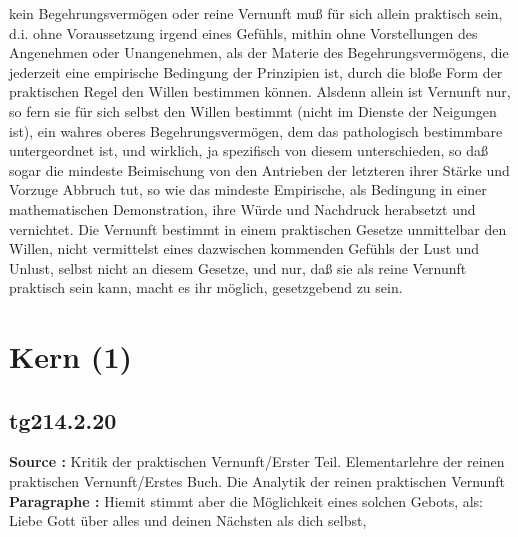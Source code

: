 \documentclass[a4paper,12pt,twoside]{book}
\newcommand{\unnumberedsection}[1]{
	\section*{#1}
	\addcontentsline{toc}{section}{#1}
	\markright{#1}
}
\begin{document}
kein Begehrungsvermögen oder reine Vernunft muß für sich allein praktisch sein, d.i. ohne Voraussetzung irgend eines Gefühls, mithin ohne Vorstellungen des Angenehmen oder Unangenehmen, als der Materie des Begehrungsvermögens, die jederzeit eine empirische Bedingung der Prinzipien ist, durch die bloße Form der praktischen Regel den Willen bestimmen können. Alsdenn allein ist Vernunft nur, so fern sie für sich selbst den Willen bestimmt (nicht im Dienste der Neigungen ist), ein wahres oberes Begehrungsvermögen, dem das pathologisch bestimmbare untergeordnet ist, und wirklich, ja spezifisch von diesem unterschieden, so daß sogar die mindeste Beimischung von den Antrieben der letzteren ihrer Stärke und Vorzuge Abbruch tut, so wie das mindeste Empirische, als Bedingung in einer mathematischen Demonstration, ihre Würde und Nachdruck herabsetzt und vernichtet. Die Vernunft bestimmt in einem praktischen Gesetze unmittelbar  den Willen, nicht vermittelst eines dazwischen kommenden Gefühls der Lust und Unlust, selbst nicht an diesem Gesetze, und nur, daß sie als reine Vernunft praktisch sein kann, macht es ihr möglich, gesetzgebend zu sein. 
	
	\unnumberedsection{Kern (1)} 
	\subsection*{tg214.2.20} 
	\textbf{Source : }Kritik der praktischen Vernunft/Erster Teil. Elementarlehre der reinen praktischen Vernunft/Erstes Buch. Die Analytik der reinen praktischen Vernunft\\  
	
	\textbf{Paragraphe : }Hiemit stimmt aber die Möglichkeit eines solchen Gebots, als: Liebe Gott über alles und deinen Nächsten als dich selbst,
	
\end{document}
